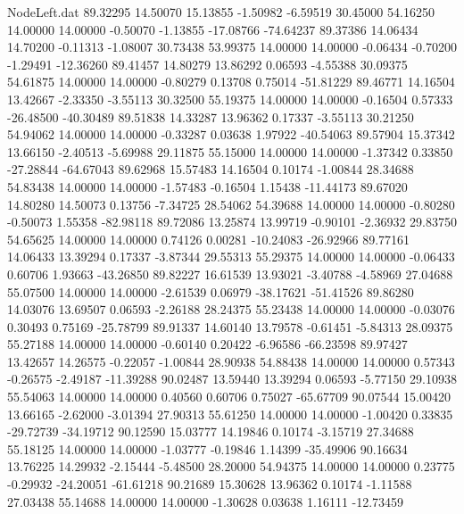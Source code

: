 \begin{filecontents}{NodeLeft.dat}
  89.32295   14.50070   15.13855    -1.50982   -6.59519   30.45000   54.16250   14.00000   14.00000   -0.50070   -1.13855  -17.08766  -74.64237
  89.37386   14.06434   14.70200    -0.11313   -1.08007   30.73438   53.99375   14.00000   14.00000   -0.06434   -0.70200   -1.29491  -12.36260
  89.41457   14.80279   13.86292     0.06593   -4.55388   30.09375   54.61875   14.00000   14.00000   -0.80279    0.13708    0.75014  -51.81229
  89.46771   14.16504   13.42667    -2.33350   -3.55113   30.32500   55.19375   14.00000   14.00000   -0.16504    0.57333  -26.48500  -40.30489
  89.51838   14.33287   13.96362     0.17337   -3.55113   30.21250   54.94062   14.00000   14.00000   -0.33287    0.03638    1.97922  -40.54063
  89.57904   15.37342   13.66150    -2.40513   -5.69988   29.11875   55.15000   14.00000   14.00000   -1.37342    0.33850  -27.28844  -64.67043
  89.62968   15.57483   14.16504     0.10174   -1.00844   28.34688   54.83438   14.00000   14.00000   -1.57483   -0.16504    1.15438  -11.44173
  89.67020   14.80280   14.50073     0.13756   -7.34725   28.54062   54.39688   14.00000   14.00000   -0.80280   -0.50073    1.55358  -82.98118
  89.72086   13.25874   13.99719    -0.90101   -2.36932   29.83750   54.65625   14.00000   14.00000    0.74126    0.00281  -10.24083  -26.92966
  89.77161   14.06433   13.39294     0.17337   -3.87344   29.55313   55.29375   14.00000   14.00000   -0.06433    0.60706    1.93663  -43.26850
  89.82227   16.61539   13.93021    -3.40788   -4.58969   27.04688   55.07500   14.00000   14.00000   -2.61539    0.06979  -38.17621  -51.41526
  89.86280   14.03076   13.69507     0.06593   -2.26188   28.24375   55.23438   14.00000   14.00000   -0.03076    0.30493    0.75169  -25.78799
  89.91337   14.60140   13.79578    -0.61451   -5.84313   28.09375   55.27188   14.00000   14.00000   -0.60140    0.20422   -6.96586  -66.23598
  89.97427   13.42657   14.26575    -0.22057   -1.00844   28.90938   54.88438   14.00000   14.00000    0.57343   -0.26575   -2.49187  -11.39288
  90.02487   13.59440   13.39294     0.06593   -5.77150   29.10938   55.54063   14.00000   14.00000    0.40560    0.60706    0.75027  -65.67709
  90.07544   15.00420   13.66165    -2.62000   -3.01394   27.90313   55.61250   14.00000   14.00000   -1.00420    0.33835  -29.72739  -34.19712
  90.12590   15.03777   14.19846     0.10174   -3.15719   27.34688   55.18125   14.00000   14.00000   -1.03777   -0.19846    1.14399  -35.49906
  90.16634   13.76225   14.29932    -2.15444   -5.48500   28.20000   54.94375   14.00000   14.00000    0.23775   -0.29932  -24.20051  -61.61218
  90.21689   15.30628   13.96362     0.10174   -1.11588   27.03438   55.14688   14.00000   14.00000   -1.30628    0.03638    1.16111  -12.73459

\end{filecontents}

